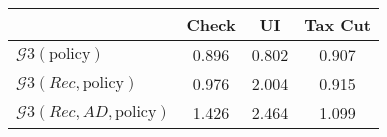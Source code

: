 \begin{tabular}{@{}lccc@{}}
\toprule
                          & Check      & UI    & Tax Cut    \\  \midrule
$\mathcal{G}3(\text{policy})$ & 0.896  & 0.802  & 0.907     \\
$\mathcal{G}3(Rec,\text{policy})$ & 0.976  & 2.004  & 0.915     \\
$\mathcal{G}3(Rec, AD,\text{policy})$ & 1.426  & 2.464  & 1.099     \\
\end{tabular}
